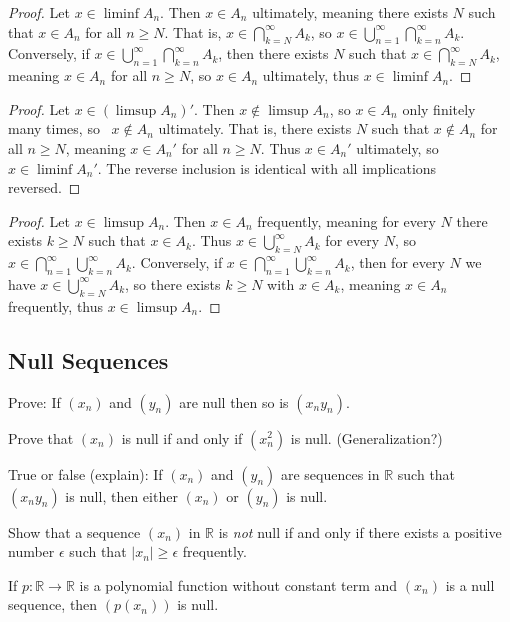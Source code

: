\begin{proof}
    Let $x \in \liminf A_n$.
    Then $x \in A_n$ ultimately, meaning there exists $N$ such that $x \in A_n$ for all $n \ge N$.
    That is, $x \in \bigcap_{k=N}^{\infty} A_k$, so $x \in \bigcup_{n=1}^{\infty} \bigcap_{k=n}^{\infty} A_k$.
    Conversely, if $x \in \bigcup_{n=1}^{\infty} \bigcap_{k=n}^{\infty} A_k$, then there exists $N$ such that
    $x \in \bigcap_{k=N}^{\infty} A_k$, meaning $x \in A_n$ for all $n \ge N$, so $x \in A_n$ ultimately,
    thus $x \in \liminf A_n$.
\end{proof}

\begin{proof}
    Let $x \in (\limsup A_n)'$.
    Then $x \notin \limsup A_n$, so $x \in A_n$ only finitely many times, so \ $x \notin A_n$ ultimately.
    That is, there exists $N$ such that $x \notin A_n$ for all $n \ge N$, meaning $x \in A_n'$ for all $n \ge N$.
    Thus $x \in A_n'$ ultimately, so $x \in \liminf A_n'$.
    The reverse inclusion is identical with all implications reversed.
\end{proof}

\begin{proof}
    Let $x \in \limsup A_n$.
    Then $x \in A_n$ frequently, meaning for every $N$ there exists $k \ge N$ such that $x \in A_k$.
    Thus $x \in \bigcup_{k=N}^{\infty} A_k$ for every $N$, so $x \in \bigcap_{n=1}^{\infty} \bigcup_{k=n}^{\infty} A_k$.
    Conversely, if $x \in \bigcap_{n=1}^{\infty} \bigcup_{k=n}^{\infty} A_k$, then for every $N$ we have
    $x \in \bigcup_{k=N}^{\infty} A_k$, so there exists $k \ge N$ with $x \in A_k$, meaning $x \in A_n$ frequently,
    thus $x \in \limsup A_n$.
\end{proof}

\subsection{Null Sequences}

\begin{tcolorbox}[title=Problem 1, breakable]
    Prove: If $(x_n)$ and $(y_n)$ are null then so is $(x_n y_n)$.
\end{tcolorbox}
\begin{tcolorbox}[title=Problem 2, breakable]
    Prove that $(x_n)$ is null if and only if $(x_n^2)$ is null. (Generalization?)
\end{tcolorbox}
\begin{tcolorbox}[title=Problem 3, breakable]
    True or false (explain): If $(x_n)$ and $(y_n)$ are sequences in $\mathbb{R}$ such
    that $(x_n y_n)$ is null, then either $(x_n)$ or $(y_n)$ is null.
\end{tcolorbox}
\begin{tcolorbox}[title=Problem 5, breakable]
    Show that a sequence $(x_n)$ in $\mathbb{R}$ is \textit{not} null if and only if there
    exists a positive number $\epsilon$ such that $|x_n| \ge \epsilon$ frequently.
\end{tcolorbox}
\begin{tcolorbox}[title=Problem 11, breakable]
    If $p : \mathbb{R} \to \mathbb{R}$ is a polynomial function without constant term and
    $(x_n)$ is a null sequence, then $(p(x_n))$ is null.
\end{tcolorbox}